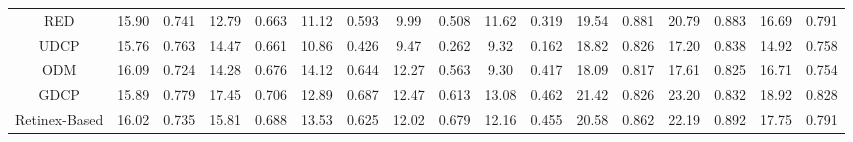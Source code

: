 \documentclass[journal]{IEEEtran}
\begin{document}
\begin{table}[htbp]
{\begin{tabular}{|c|cc|cc|cc|cc|cc|cc|cc|cc|}
RED \cite{RED}                       & 15.90                        & 0.741                        & 12.79                        & 0.663                        & 11.12                        & 0.593                        & 9.99                         & 0.508                        & 11.62                        & 0.319                        & 19.54                        & 0.881                        & 20.79                        & 0.883                        & 16.69                        & 0.791                        \\
UDCP \cite{UDCP}                       & 15.76                        & 0.763                        & 14.47                        & 0.661                        & 10.86                        & 0.426                        & 9.47                         & 0.262                        & 9.32                         & 0.162                        & 18.82                        & 0.826                        & 17.20                        & 0.838                        & 14.92                        & 0.758                        \\
ODM \cite{Histogram-prior}                        & 16.09                        & 0.724                        & 14.28                        & 0.676                        & 14.12                        & 0.644                        & 12.27                        & 0.563                        & 9.30                         & 0.417                        & 18.09                        & 0.817                        & 17.61                        & 0.825                        & 16.71                        & 0.754                        \\
GDCP \cite{GDCP}                         & 15.89                        & 0.779                        & 17.45                        & 0.706                        & 12.89                        & 0.687                        & 12.47                        & 0.613                        & 13.08                        & 0.462                        & 21.42                        & 0.826                        & 23.20                        & 0.832                        & 18.92                        & 0.828                        \\
Retinex-Based \cite{fu2014retinex}              & 16.02                        & 0.735                        & 15.81                        & 0.688                        & 13.53                        & 0.625                        & 12.02                        & 0.679                        & 12.16                        & 0.455                        & 20.58                        & 0.862                        & 22.19                        & 0.892                        & 17.75                        & 0.791                        \\

\end{tabular}}
\end{table}
\end{document}
